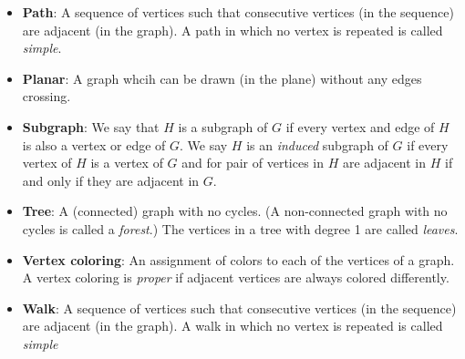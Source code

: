 \documentclass[10pt]{exam}
\begin{document}
\begin{itemize}
    \item[] {\bf Path}: A sequence of vertices such that consecutive vertices (in the sequence) are adjacent (in the graph).  A path in which no vertex is repeated is called {\em simple}.
    \item[] {\bf Planar}: A graph whcih can be drawn (in the plane) without any edges crossing.
    \item[] {\bf Subgraph}: We say that $H$ is a subgraph of $G$ if every vertex and edge of $H$ is also a vertex or edge of $G$.  We say $H$ is an {\em induced} subgraph of $G$ if every vertex of $H$ is a vertex of $G$ and for pair of vertices in $H$ are adjacent in $H$ if and only if they are adjacent in $G$.
    \item[] {\bf Tree}: A (connected) graph with no cycles.  (A non-connected graph with no cycles is called a {\em forest}.)  The vertices in a tree with degree 1 are called {\em leaves}.
    \item[] {\bf Vertex coloring}: An assignment of colors to each of the vertices of a graph. A vertex coloring is {\em proper} if adjacent vertices are always colored differently.
		\item[] {\bf Walk}: A sequence of vertices such that consecutive vertices (in the sequence) are adjacent (in the graph).  A walk in which no vertex is repeated is called {\em simple}


  \end{itemize}
\end{document}
